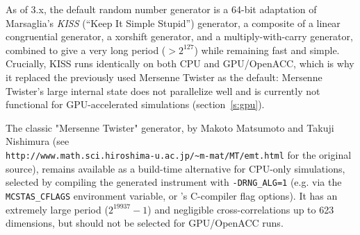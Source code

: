 As of \MCS 3.x, the default random number generator is a 64-bit
adaptation of Marsaglia's \emph{KISS} (``Keep It Simple Stupid'')
generator, a composite of a linear congruential generator, a xorshift
generator, and a multiply-with-carry generator, combined to give a very
long period ($>2^{127}$) while remaining fast and simple. Crucially,
KISS runs identically on both CPU and GPU/OpenACC, which is why it
replaced the previously used Mersenne Twister as the default: Mersenne
Twister's large internal state does not parallelize well and is
currently not functional for GPU-accelerated simulations
(section~\ref{s:gpu}).

The classic "Mersenne Twister" generator, by Makoto Matsumoto and
Takuji Nishimura (see \\
\verb+http://www.math.sci.hiroshima-u.ac.jp/~m-mat/MT/emt.html+ for the
original source), remains available as a build-time alternative for
CPU-only simulations, selected by compiling the generated instrument
with \verb+-DRNG_ALG=1+ (e.g. via the \verb+MCSTAS_CFLAGS+ environment
variable, or \mcs's C-compiler flag options). It has an extremely
large period ($2^{19937}-1$) and negligible cross-correlations up to
623 dimensions, but should not be selected for GPU/OpenACC runs.
